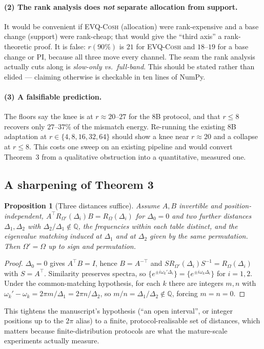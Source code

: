 \documentclass[11pt]{article}
\newtheorem{proposition}[theorem]{Proposition}
\theoremstyle{definition}
\newcommand{\evq}{\textsc{EVQ-Cosh}}
\begin{document}
\paragraph{(2) The rank analysis does \emph{not} separate allocation from support.}
It would be convenient if \evq{} (allocation) were rank-expensive and a base change (support) were
rank-cheap; that would give the ``third axis'' a rank-theoretic proof. It is false:
$r(90\%)$ is $21$ for \evq{} and $18$--$19$ for a base change or PI, because all three move every
channel. The seam the rank analysis actually cuts along is \emph{slow-only vs.\ full-band}. This
should be stated rather than elided --- claiming otherwise is checkable in ten lines of NumPy.

\paragraph{(3) A falsifiable prediction.}
The floors say the knee is at $r\approx20$--$27$ for the 8B protocol, and that $r\le8$ recovers
only $27$--$37\%$ of the mismatch energy. Re-running the existing 8B adaptation at
$r\in\{4,8,16,32,64\}$ should show a knee near $r\approx20$ and a collapse at $r\le8$. This costs
one sweep on an existing pipeline and would convert Theorem~3 from a qualitative obstruction into a
quantitative, measured one.

\subsection{A sharpening of Theorem 3}

\begin{proposition}[Three distances suffice]\label{prop:thm3sharp}
Assume $A,B$ invertible and position-independent, $A^\top R_{\Omega'}(\Delta_i)B=R_\Omega(\Delta_i)$
for $\Delta_0=0$ and two further distances $\Delta_1,\Delta_2$ with $\Delta_2/\Delta_1\notin\mathbb Q$,
the frequencies within each table distinct, and the eigenvalue matching induced at $\Delta_1$ and at
$\Delta_2$ given by the same permutation. Then $\Omega'=\Omega$ up to sign and permutation.
\end{proposition}
\begin{proof}
$\Delta_0=0$ gives $A^\top B=I$, hence $B=A^{-\top}$ and $S R_{\Omega'}(\Delta_i)S^{-1}=R_\Omega(\Delta_i)$
with $S=A^\top$. Similarity preserves spectra, so
$\{e^{\pm i\omega_k'\Delta_i}\}=\{e^{\pm i\omega_k\Delta_i}\}$ for $i=1,2$. Under the common-matching
hypothesis, for each $k$ there are integers $m,n$ with
$\omega_k'-\omega_k=2\pi m/\Delta_1=2\pi n/\Delta_2$, so $m/n=\Delta_1/\Delta_2\notin\mathbb Q$,
forcing $m=n=0$.
\end{proof}
This tightens the manuscript's hypothesis (``an open interval'', or integer positions up to the
$2\pi$ alias) to a finite, protocol-realisable set of distances, which matters because
finite-distribution protocols are what the mature-scale experiments actually measure.
\end{document}
